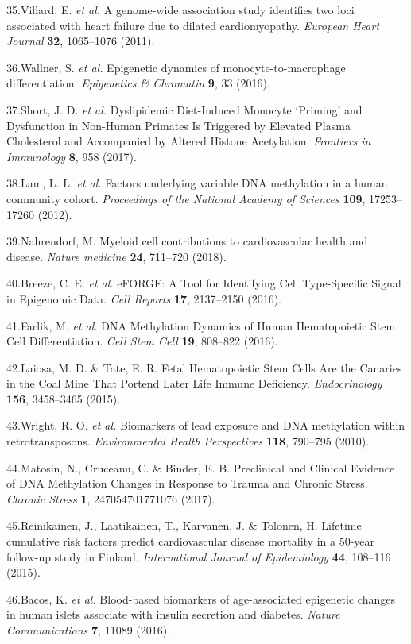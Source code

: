 \documentclass[]{article}
\theoremstyle{definition}
\theoremstyle{definition}
\theoremstyle{definition}
\theoremstyle{remark}
\begin{document}
35.Villard, E. \emph{et al.} A genome-wide association study identifies
two loci associated with heart failure due to dilated cardiomyopathy.
\emph{European Heart Journal} \textbf{32}, 1065--1076 (2011).

36.Wallner, S. \emph{et al.} Epigenetic dynamics of
monocyte-to-macrophage differentiation. \emph{Epigenetics \& Chromatin}
\textbf{9}, 33 (2016).

37.Short, J. D. \emph{et al.} Dyslipidemic Diet-Induced Monocyte
`Priming' and Dysfunction in Non-Human Primates Is Triggered by Elevated
Plasma Cholesterol and Accompanied by Altered Histone Acetylation.
\emph{Frontiers in Immunology} \textbf{8}, 958 (2017).

38.Lam, L. L. \emph{et al.} Factors underlying variable DNA methylation
in a human community cohort. \emph{Proceedings of the National Academy
of Sciences} \textbf{109}, 17253--17260 (2012).

39.Nahrendorf, M. Myeloid cell contributions to cardiovascular health
and disease. \emph{Nature medicine} \textbf{24}, 711--720 (2018).

40.Breeze, C. E. \emph{et al.} eFORGE: A Tool for Identifying Cell
Type-Specific Signal in Epigenomic Data. \emph{Cell Reports}
\textbf{17}, 2137--2150 (2016).

41.Farlik, M. \emph{et al.} DNA Methylation Dynamics of Human
Hematopoietic Stem Cell Differentiation. \emph{Cell Stem Cell}
\textbf{19}, 808--822 (2016).

42.Laiosa, M. D. \& Tate, E. R. Fetal Hematopoietic Stem Cells Are the
Canaries in the Coal Mine That Portend Later Life Immune Deficiency.
\emph{Endocrinology} \textbf{156}, 3458--3465 (2015).

43.Wright, R. O. \emph{et al.} Biomarkers of lead exposure and DNA
methylation within retrotransposons. \emph{Environmental Health
Perspectives} \textbf{118}, 790--795 (2010).

44.Matosin, N., Cruceanu, C. \& Binder, E. B. Preclinical and Clinical
Evidence of DNA Methylation Changes in Response to Trauma and Chronic
Stress. \emph{Chronic Stress} \textbf{1}, 247054701771076 (2017).

45.Reinikainen, J., Laatikainen, T., Karvanen, J. \& Tolonen, H.
Lifetime cumulative risk factors predict cardiovascular disease
mortality in a 50-year follow-up study in Finland. \emph{International
Journal of Epidemiology} \textbf{44}, 108--116 (2015).

46.Bacos, K. \emph{et al.} Blood-based biomarkers of age-associated
epigenetic changes in human islets associate with insulin secretion and
diabetes. \emph{Nature Communications} \textbf{7}, 11089 (2016).
\end{document}
